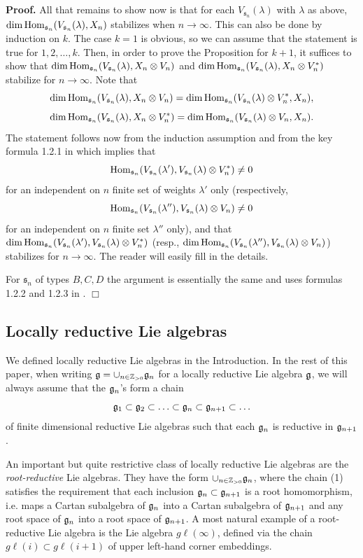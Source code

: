 \documentclass[12pt]{article}
\newenvironment{proof}{ \textbf{Proof.}}{$\Box$}
\newcommand {\ZZ} {\mathbb {Z}}
\renewcommand{\ss}{\mathfrak{s}}
\newcommand{\gl}{{g\ell}}
\def\Hom{\text{\rm Hom}}
\begin{document}
\begin{proof}
All that remains to show now is that for each $V_{\ss_n}(\lambda)$ with $\lambda$ as above, $\dim \Hom_{\ss_n}(V_{\ss_n}(\lambda), X_n)$ stabilizes when $n\to\infty$. This can also be done by induction on $k$. The case $k=1$ is obvious, so we can assume that the statement is true for $1,2,\dots,k$. Then, in order to prove the Proposition for $k+1$, it suffices to show that $\dim \Hom_{\ss_n}(V_{\ss_n}(\lambda), X_n\otimes V_n)$ and $\dim \Hom_{\ss_n}(V_{\ss_n}(\lambda), X_n\otimes V_n^*)$ stabilize for $n\to \infty$. Note that
\[
\dim \Hom_{\ss_n}(V_{\ss_n}(\lambda), X_n\otimes V_n)= \dim \Hom_{\ss_n}(V_{\ss_n}(\lambda)\otimes V_n^*, X_n),
\]
\[
\dim \Hom_{\ss_n}(V_{\ss_n}(\lambda), X_n\otimes V_n^*)= \dim \Hom_{\ss_n}(V_{\ss_n}(\lambda)\otimes V_n, X_n).
\]
The statement follows now from the induction assumption and from the key formula 1.2.1 in \cite{HTW} which implies that
\[
\Hom_{\ss_n}(V_{\ss_n}(\lambda'), V_{\ss_n}(\lambda)\otimes V_n^*)\neq 0
\]
for an independent on $n$ finite set of weights $\lambda'$ only (respectively,
\[
\Hom_{\ss_n}(V_{\ss_n}(\lambda''), V_{\ss_n}(\lambda)\otimes V_n)\neq 0
\]
for an independent on $n$ finite set $\lambda''$ only), and that $\dim \Hom_{\ss_n}(V_{\ss_n}(\lambda'), V_{\ss_n}(\lambda)\otimes V_n^*)$ (resp., $\dim\Hom_{\ss_n}(V_{\ss_n}(\lambda''), V_{\ss_n}(\lambda)\otimes V_n)$) stabilizes for $n\to\infty$. The reader will easily fill in the details.

For $\ss_n$ of types $B,C,D$ the argument is essentially the same and uses formulas 1.2.2 and 1.2.3 in \cite{HTW}.
\end{proof}

\subsection{Locally reductive Lie algebras}\label{sec23}  We defined locally reductive Lie algebras in the Introduction.  In the rest of this paper, when writing $\frak g = \cup_{n\in\ZZ_{> 0}} \frak g_n$ for a locally reductive Lie algebra $\frak g$, we will always assume that the $\frak g_n$'s form a chain
\begin{equation}\label{eq1}
\frak g_1\subset\frak g_2\subset\ldots\subset \frak g_n \subset\frak g_{n+1} \subset\ldots
\end{equation}
of finite dimensional reductive Lie algebras such that each $\frak g_n$ is reductive in $\frak g_{n+1}$.

An important but quite restrictive class of locally reductive Lie algebras are the {\it root-reductive} Lie algebras.  They have the form $\cup_{n\in\ZZ_{> 0}}\frak g_n$, where the chain (1) satisfies the requirement that each inclusion $\frak g_n\subset\frak g_{n+1}$ is a root homomorphism, i.e. maps a Cartan subalgebra of $\frak g_n$ into a Cartan subalgebra of $\frak g_{n+1}$ and any root space of $\frak g_n$ into a root space of $\frak g_{n+1}$. A most natural example of a root-reductive Lie algebra is the Lie algebra $\gl(\infty)$, defined via the chain $\gl(i)\subset\gl(i+1)$ of upper left-hand corner embeddings.
\end{document}
